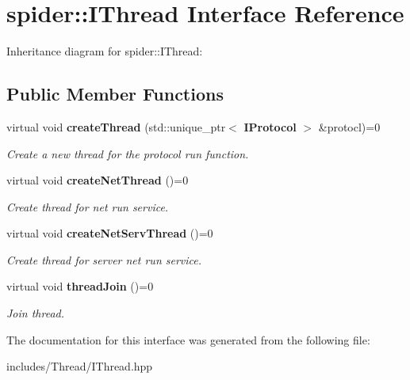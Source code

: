 \section{spider\+:\+:I\+Thread Interface Reference}
\label{classspider_1_1_i_thread}


Inheritance diagram for spider\+:\+:I\+Thread\+:
\subsection*{Public Member Functions}
\begin{DoxyCompactItemize}
\item 
\mbox{\label{classspider_1_1_i_thread_a1fe8cb13aa5aa46ad5368e64ba850dc3}} 
virtual void \textbf{ create\+Thread} (std\+::unique\+\_\+ptr$<$ \textbf{ I\+Protocol} $>$ \&protocl)=0
\begin{DoxyCompactList}\small\item\em Create a new thread for the protocol run function. \end{DoxyCompactList}\item 
\mbox{\label{classspider_1_1_i_thread_a5419f2562c74a22646b339c827c00005}} 
virtual void \textbf{ create\+Net\+Thread} ()=0
\begin{DoxyCompactList}\small\item\em Create thread for net run service. \end{DoxyCompactList}\item 
\mbox{\label{classspider_1_1_i_thread_ae098f50dbd14c5b50229b95040bea753}} 
virtual void \textbf{ create\+Net\+Serv\+Thread} ()=0
\begin{DoxyCompactList}\small\item\em Create thread for server net run service. \end{DoxyCompactList}\item 
\mbox{\label{classspider_1_1_i_thread_a20f8101a7e96b853e5810f2978979070}} 
virtual void \textbf{ thread\+Join} ()=0
\begin{DoxyCompactList}\small\item\em Join thread. \end{DoxyCompactList}\end{DoxyCompactItemize}


The documentation for this interface was generated from the following file\+:\begin{DoxyCompactItemize}
\item 
includes/\+Thread/I\+Thread.\+hpp\end{DoxyCompactItemize}
